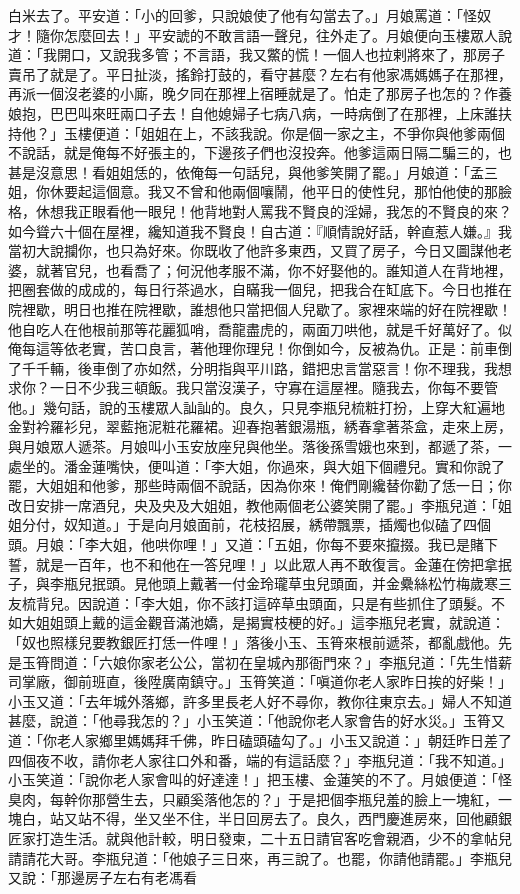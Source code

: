 白米去了。平安道：「小的回爹，只說娘使了他有勾當去了。」月娘罵道：「怪奴才！隨你怎麼回去！」平安諕的不敢言語一聲兒，往外走了。月娘便向玉樓眾人說道：「我開口，又說我多管；不言語，我又鱉的慌！一個人也拉剌將來了，那房子賣吊了就是了。平日扯淡，搖鈴打鼓的，看守甚麼？左右有他家馮媽媽子在那裡，再派一個沒老婆的小廝，晚夕同在那裡上宿睡就是了。怕走了那房子也怎的？作養娘抱，巴巴叫來旺兩口子去！自他媳婦子七病八病，一時病倒了在那裡，上床誰扶持他？」玉樓便道：「姐姐在上，不該我說。你是個一家之主，不爭你與他爹兩個不說話，就是俺每不好張主的，下邊孩子們也沒投奔。他爹這兩日隔二騙三的，也甚是沒意思！看姐姐恁的，依俺每一句話兒，與他爹笑開了罷。」月娘道：「孟三姐，你休要起這個意。我又不曾和他兩個嚷鬧，他平日的使性兒，那怕他使的那臉格，休想我正眼看他一眼兒！他背地對人罵我不賢良的淫婦，我怎的不賢良的來？如今聳六十個在屋裡，纔知道我不賢良！自古道：『順情說好話，幹直惹人嫌。』我當初大說攔你，也只為好來。你既收了他許多東西，又買了房子，今日又圖謀他老婆，就著官兒，也看喬了；何況他孝服不滿，你不好娶他的。誰知道人在背地裡，把圈套做的成成的，每日行茶過水，自瞞我一個兒，把我合在缸底下。今日也推在院裡歇，明日也推在院裡歇，誰想他只當把個人兒歇了。家裡來端的好在院裡歇！他自吃人在他根前那等花麗狐哨，喬龍盡虎的，兩面刀哄他，就是千好萬好了。似俺每這等依老實，苦口良言，著他理你理兒！你倒如今，反被為仇。正是：前車倒了千千輛，後車倒了亦如然，分明指與平川路，錯把忠言當惡言！你不理我，我想求你？一日不少我三頓飯。我只當沒漢子，守寡在這屋裡。隨我去，你每不要管他。」幾句話，說的玉樓眾人訕訕的。良久，只見李瓶兒梳粧打扮，上穿大紅遍地金對衿羅衫兒，翠藍拖泥粧花羅裙。迎春抱著銀湯瓶，綉春拿著茶盒，走來上房，與月娘眾人遞茶。月娘叫小玉安放座兒與他坐。落後孫雪娥也來到，都遞了茶，一處坐的。潘金蓮嘴快，便叫道：「李大姐，你過來，與大姐下個禮兒。實和你說了罷，大姐姐和他爹，那些時兩個不說話，因為你來！俺們剛纔替你勸了恁一日；你改日安排一席酒兒，央及央及大姐姐，教他兩個老公婆笑開了罷。」李瓶兒道：「姐姐分付，奴知道。」于是向月娘面前，花枝招展，綉帶飄票，插燭也似磕了四個頭。月娘：「李大姐，他哄你哩！」又道：「五姐，你每不要來攛掇。我已是賭下誓，就是一百年，也不和他在一答兒哩！」以此眾人再不敢復言。金蓮在傍把拿抿子，與李瓶兒抿頭。見他頭上戴著一付金玲瓏草虫兒頭面，并金纍絲松竹梅歲寒三友梳背兒。因說道：「李大姐，你不該打這碎草虫頭面，只是有些抓住了頭髮。不如大姐姐頭上戴的這金觀音滿池嬌，是揭實枝梗的好。」這李瓶兒老實，就說道：「奴也照樣兒要教銀匠打恁一件哩！」落後小玉、玉筲來根前遞茶，都亂戲他。先是玉筲問道：「六娘你家老公公，當初在皇城內那衙門來？」李瓶兒道：「先生惜薪司掌廠，御前班直，後陞廣南鎮守。」玉筲笑道：「嗔道你老人家昨日挨的好柴！」小玉又道：「去年城外落鄉，許多里長老人好不尋你，教你往東京去。」婦人不知道甚麼，說道：「他尋我怎的？」小玉笑道：「他說你老人家會告的好水災。」玉筲又道：「你老人家鄉里媽媽拜千佛，昨日磕頭磕勾了。」小玉又說道：」朝廷昨日差了四個夜不收，請你老人家往口外和番，端的有這話麼？」李瓶兒道：「我不知道。」小玉笑道：「說你老人家會叫的好達達！」把玉樓、金蓮笑的不了。月娘便道：「怪臭肉，每幹你那營生去，只顧奚落他怎的？」于是把個李瓶兒羞的臉上一塊紅，一塊白，站又站不得，坐又坐不住，半日回房去了。良久，西門慶進房來，回他顧銀匠家打造生活。就與他計較，明日發柬，二十五日請官客吃會親酒，少不的拿帖兒請請花大哥。李瓶兒道：「他娘子三日來，再三說了。也罷，你請他請罷。」李瓶兒又說：「那邊房子左右有老馮看